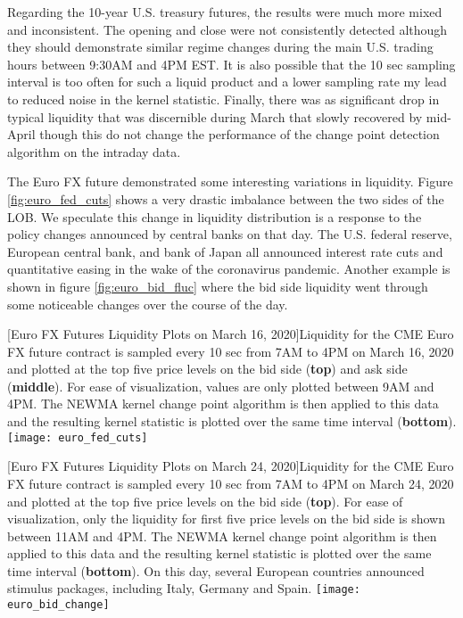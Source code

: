 Regarding the 10-year U.S. treasury futures, the results were much more mixed and inconsistent. The opening and close were not consistently detected although they should demonstrate similar regime changes during the main U.S. trading hours between 9:30AM and 4PM EST. It is also possible that the 10 sec sampling interval is too often for such a liquid product and a lower sampling rate my lead to reduced noise in the kernel statistic. Finally, there was as significant drop in typical liquidity that was discernible during March that slowly recovered by mid-April though this do not change the performance of the change point detection algorithm on the intraday data. 

The Euro FX future demonstrated some interesting variations in liquidity. Figure \ref{fig:euro_fed_cuts} shows a very drastic imbalance between the two sides of the LOB. We speculate this change in liquidity distribution is a response to the policy changes announced by central banks on that day. The U.S. federal reserve, European central bank, and bank of Japan all announced interest rate cuts and quantitative easing in the wake of the coronavirus pandemic. Another example is shown in figure \ref{fig:euro_bid_fluc} where the bid side liquidity went through some noticeable changes over the course of the day. 

\begin{center} 
[Euro FX Futures Liquidity Plots on March 16, 2020]{Liquidity for the CME Euro FX future contract is sampled every 10 sec from 7AM to 4PM on March 16, 2020 and plotted at the top five price levels on the bid side (\textbf{top}) and ask side (\textbf{middle}). For ease of visualization, values are only plotted between 9AM and 4PM. The NEWMA kernel change point algorithm is then applied to this data and the resulting kernel statistic is plotted over the same time interval (\textbf{bottom}). }
\texttt{[image: euro\_fed\_cuts]} 
\label{fig:euro_fed_cuts} 
\end{center}

\begin{center} 
[Euro FX Futures Liquidity Plots on March 24, 2020]{Liquidity for the CME Euro FX future contract is sampled every 10 sec from 7AM to 4PM on March 24, 2020 and plotted at the top five price levels on the bid side (\textbf{top}). For ease of visualization, only the liquidity for first five price levels on the bid side is shown between 11AM and 4PM. The NEWMA kernel change point algorithm is then applied to this data and the resulting kernel statistic is plotted over the same time interval (\textbf{bottom}). On this day, several European countries announced stimulus packages, including Italy, Germany and Spain.}
\texttt{[image: euro\_bid\_change]} 
\label{fig:euro_bid_fluc} 
\end{center}

